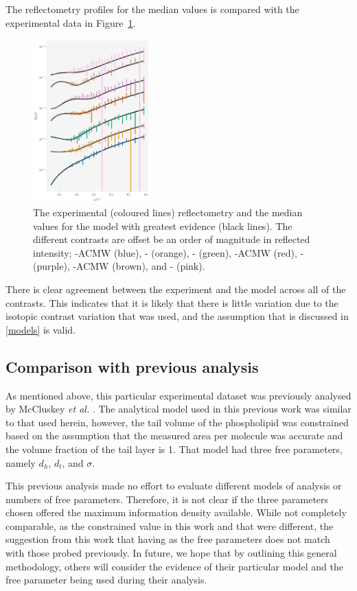 \documentclass[%
 reprint,
 superscriptaddress,
 amsmath,amssymb,
 aps,
]{revtex4-1}
\begin{document}
The reflectometry profiles for the median values is compared with the experimental data in Figure~\ref{fig:refl}. 
%
\begin{figure}
\includegraphics[width=0.4\textwidth]{refl}
\caption{\label{fig:refl} The experimental (coloured lines) reflectometry and the median values for the model with greatest evidence (black lines). The different contrasts are offset be an order of magnitude in reflected intensity; -ACMW (blue), - (orange), - (green), -ACMW (red), - (purple), -ACMW (brown), and - (pink).}
\end{figure}
%
There is clear agreement between the experiment and the model across all of the contrasts. 
This indicates that it is likely that there is little variation due to the isotopic contrast variation that was used, and the assumption that is discussed in \ref{models} is valid. 

\subsection{Comparison with previous analysis}

As mentioned above, this particular experimental dataset was previously analysed by McCluskey \emph{et al.} \cite{mccluskey_assessing_2019}.
The analytical model used in this previous work was similar to that used herein, however, the tail volume of the phospholipid was constrained based on the assumption that the measured area per molecule was accurate and the volume fraction of the tail layer is \num{1}. 
That model had three free parameters, namely $d_h$, $d_t$, and $\sigma$. 

This previous analysis made no effort to evaluate different models of analysis or numbers of free parameters. 
Therefore, it is not clear if the three parameters chosen offered the maximum information density available. 
While not completely comparable, as the constrained value in this work and that were different, the suggestion from this work that having \unskip\;as the free parameters does not match with those probed previously.
In future, we hope that by outlining this general methodology, others will consider the evidence of their particular model and the free parameter being used during their analysis.
\end{document}
